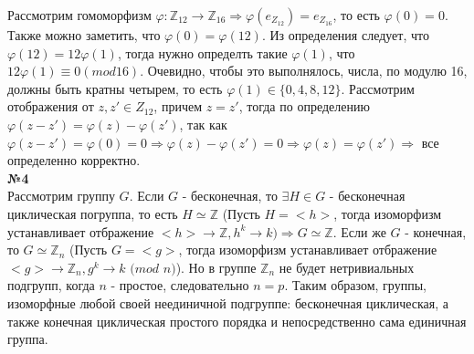 \documentclass[a4paper, 12pt]{article}
\begin{document}
	Рассмотрим гомоморфизм $\varphi : \mathbb Z_{12} \longrightarrow \mathbb Z_{16} \Longrightarrow \varphi(e_{Z_{12}}) = e_{Z_{16}}$, то есть $\varphi(0) = 0$. Также можно заметить, что $\varphi(0) = \varphi(12)$. Из определения следует, что $\varphi(12) = 12\varphi(1)$, тогда нужно определть такие $\varphi(1)$, что $12\varphi(1) \equiv 0 (mod 16)$. Очевидно, чтобы это выполнялось, числа, по модулю 16, должны быть кратны четырем, то есть $\varphi(1) \in \{0, 4, 8, 12\}$. Рассмотрим отображения от $z, z' \in Z_{12}$, причем $z = z'$, тогда по определению $\varphi(z - z') = \varphi(z) - \varphi(z')$, так как $\varphi(z - z') = \varphi(0) = 0 \Longrightarrow \varphi(z) - \varphi(z') = 0 \Longrightarrow \varphi(z) = \varphi(z') \Longrightarrow$ все определенно корректно. \\
	
	\textbf{№4} \\
	
	Рассмотрим группу $G$. Если $G$ - бесконечная, то $\exists H \in G$ - бесконечная циклическая погруппа, то есть $H \simeq \mathbb Z$ (Пусть $H = <h>$, тогда изоморфизм устанавливает отбражение $<h> \longrightarrow \mathbb Z, h^k \longrightarrow k) \Rightarrow G \simeq \mathbb Z$. Если же $G$ - конечная, то $G \simeq \mathbb Z_n$ (Пусть $G = <g>$, тогда изоморфизм устанавливает отбражение $<g> \longrightarrow \mathbb Z_n, g^k \longrightarrow k$ $(mod$ $n)$). Но в группе $\mathbb Z_n$ не будет нетривиальных подгрупп, когда $n$ - простое, следовательно $n = p$. Таким образом, группы, изоморфные любой своей неединичной подгруппе: бесконечная циклическая, а также конечная циклическая простого порядка и непосредственно сама единичная группа.
	
\end{document}
